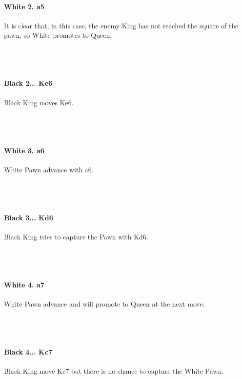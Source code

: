 \documentclass{article}
\begin{document}
\\
\textbf{White 2. a5}\\
\\
It is clear that, in this case, the enemy King has not reached the square of the pawn, so White promotes to Queen.\\\\
\\

\\
\\
\textbf{Black 2... Ke6}\\
\\
Black King moves Ke6.\\\\
\\

\\
\\
\textbf{White 3. a6}\\
\\
White Pawn advance with a6.\\\\
\\

\\
\\
\textbf{Black 3... Kd6}\\
\\
Black King tries to capture the Pawn with Kd6.\\\\
\\

\\
\\
\textbf{White 4. a7}\\
\\
White Pawn advance and will promote to Queen at the next move.\\\\
\\

\\
\\
\textbf{Black 4... Kc7}\\
\\
Black King move Kc7 but there is no chance to capture the White Pawn.\\\\
\end{document}
